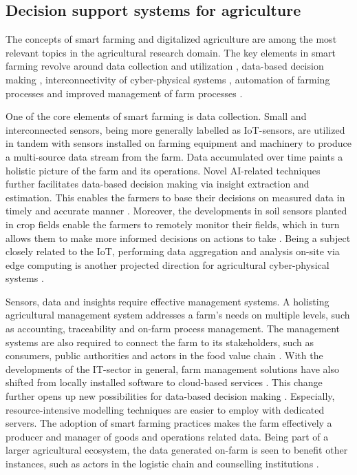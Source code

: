 \subsection{Decision support systems for agriculture}
\label{subsec:dss-for-agri-review}

The concepts of smart farming and digitalized agriculture are among the most relevant topics in the agricultural research domain. The key elements in smart farming revolve around data collection and utilization \cite{Klerkx2019}, data-based decision making \cite{Kamilaris2017}, interconnectivity of cyber-physical systems \cite{Zamora-Izquierdo2019}, automation of farming processes \cite{Zamora-Izquierdo2019} and improved management of farm processes \cite{Tantalaki2019}. 

One of the core elements of smart farming is data collection. Small and interconnected sensors, being more generally labelled as IoT-sensors, are utilized in tandem with sensors installed on farming equipment and machinery to produce a multi-source data stream from the farm. Data accumulated over time paints a holistic picture of the farm and its operations. Novel AI-related techniques further facilitates data-based decision making via insight extraction and estimation. This enables the farmers to base their decisions on measured data in timely and accurate manner \cite{Sundmaeker2016}. Moreover, the developments in soil sensors planted in crop fields enable the farmers to remotely monitor their fields, which in turn allows them to make more informed decisions on actions to take \cite{Tantalaki2019}. Being a subject closely related to the IoT, performing data aggregation and analysis on-site via edge computing is another projected direction for agricultural cyber-physical systems \cite{Zamora-Izquierdo2019}. 

Sensors, data and insights require effective management systems. A holisting agricultural management system addresses a farm's needs on multiple levels, such as accounting, traceability and on-farm process management. The management systems are also required to connect the farm to its stakeholders, such as consumers, public authorities and actors in the food value chain \cite{Tantalaki2019}. With the developments of the IT-sector in general, farm management solutions have also shifted from locally installed software to cloud-based services \cite{Zamora-Izquierdo2019}. This change further opens up new possibilities for data-based decision making \cite{Rose2018}. Especially, resource-intensive modelling techniques are easier to employ with dedicated servers. The adoption of smart farming practices makes the farm effectively a producer and manager of goods and operations related data. Being part of a larger agricultural ecosystem, the data generated on-farm is seen to benefit other instances, such as actors in the logistic chain and counselling institutions \cite{Kamilaris2017}.

